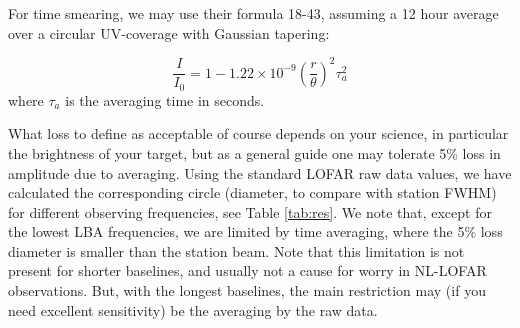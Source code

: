 \documentclass[graybox]{svmult}
\begin{document}
For time smearing, we may use their formula 18-43, assuming a 12 hour average
over a circular UV-coverage with Gaussian tapering:

\begin{equation}
\frac{I}{I_0} = 1-1.22\times 10^{-9}\left(\frac{r}{\theta}\right)^2\tau_a^2
\label{eqn:timeloss}
\end{equation}
where $\tau_a$ is the averaging time in seconds.

What loss to define as acceptable of course depends on your science, in
particular the brightness of your target, but as a general guide one may
tolerate 5\% loss in amplitude due to averaging. Using the standard LOFAR raw
data values, we have calculated the corresponding circle (diameter, to compare
with station FWHM) for different observing frequencies, see Table
\ref{tab:res}. We note that, except for the lowest LBA frequencies, we are
limited by time averaging, where the 5\% loss diameter is smaller than the
station beam. Note that this limitation is not present for shorter baselines,
and usually not a cause for worry in NL-LOFAR observations. But, with the
longest baselines, the main restriction may (if you need excellent sensitivity)
be the averaging by the raw data. 
\end{document}

